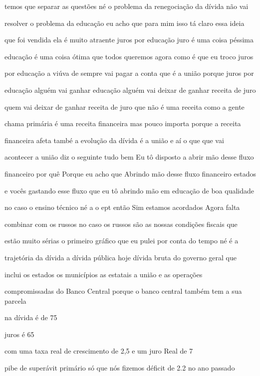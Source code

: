 \documentclass[a4paper,12pt]{article}
\begin{document}
temos que separar as questões né o problema da renegociação da dívida não vai

resolver o problema da educação eu acho que para mim isso tá claro essa ideia

que foi vendida ela é muito atraente juros por educação juro é uma coisa péssima

educação é uma coisa ótima que todos queremos agora como é que eu troco juros

por educação a viúva de sempre vai pagar a conta que é a união porque juros por

educação alguém vai ganhar educação alguém vai deixar de ganhar receita de juro

quem vai deixar de ganhar receita de juro que não é uma receita como a gente

chama primária é uma receita financeira mas pouco importa porque a receita

financeira afeta també a evolução da dívida é a união e aí o que que vai

acontecer a união diz o seguinte tudo bem Eu tô disposto a abrir mão desse fluxo

financeiro por quê Porque eu acho que Abrindo mão desse fluxo financeiro estados

e vocês gastando esse fluxo que eu tô abrindo mão em educação de boa qualidade

no caso o ensino técnico né a o ept então Sim estamos acordados Agora falta

combinar com os russos no caso os russos são as nossas condições fiscais que

estão muito sérias o primeiro gráfico que eu pulei por conta do tempo né é a

trajetória da dívida a dívida pública hoje dívida bruta do governo geral que

inclui os estados os municípios as estatais a união e as operações

compromissadas do Banco Central porque o banco central também tem a sua parcela

na dívida é de 75%

juros é 65%

com uma taxa real de crescimento de 2,5 e um juro Real de 7%

pibe de superávit primário só que nós fizemos déficit de 2.2 no ano passado
\end{document}
